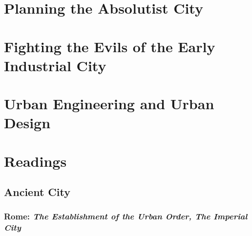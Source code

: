 \documentclass{article}
\begin{document}
\section{Planning the Absolutist City}

\section{Fighting the Evils of the Early Industrial City}

\section{Urban Engineering and Urban Design}


\section{Readings}

\subsection{Ancient City}

\subsubsection{Rome: \textit{The Establishment of the Urban Order, The Imperial City} \parencite{hall1998cities}}
\end{document}
